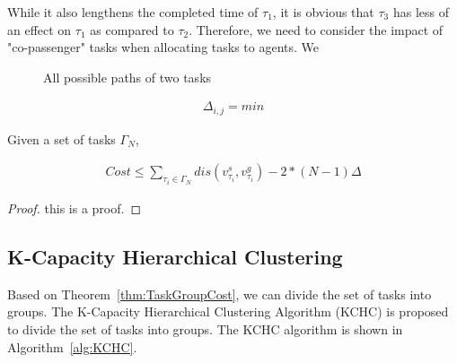 \documentclass[sigconf,anonymous]{aamas}
\begin{document}
While it also lengthens the completed time of $\tau_{1}$, 
it is obvious that $\tau_3$ has less of an effect on $\tau_1$ as compared to $\tau_{2}$.
Therefore, we need to consider the impact of "co-passenger" tasks when allocating tasks to agents.
We 
\begin{figure}[htbp]
  \centering
  \caption{All possible paths of two tasks}
  \label{fig:2TP}
\end{figure}


\begin{eqnarray}
  \label{eq:cp2}
  \Delta_{i,j} = min
\end{eqnarray}



\begin{theorem}
  \label{thm:TaskGroupCost}
  Given a set of tasks $\Gamma_{N}$, 
\end{theorem}

\begin{eqnarray}
\label{eq:tgc}
    Cost \leq \sum_{\tau_i \in \Gamma_N}{dis(v^{s}_{\tau_i}, v^{g}_{\tau_i})} - 2*(N-1)\Delta
\end{eqnarray}

\begin{proof}
    this is a proof.
\end{proof}

\subsection{K-Capacity Hierarchical Clustering}
Based on Theorem~\ref{thm:TaskGroupCost}, we can divide the set of tasks into groups.
The K-Capacity Hierarchical Clustering Algorithm (KCHC) is proposed to divide the set of tasks into groups.
The KCHC algorithm is shown in Algorithm~\ref{alg:KCHC}.
\end{document}

